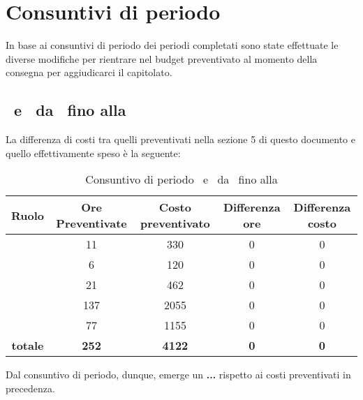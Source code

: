 \newpage
\section{Consuntivi di periodo}

In base ai consuntivi di periodo dei periodi completati sono state effettuate le diverse modifiche per rientrare nel budget preventivato al momento della consegna per aggiudicarci il capitolato.

\subsection{\PD\ e \COD\ da \RP\ fino alla \RQ}
La differenza di costi tra quelli preventivati nella sezione 5 di questo documento e quello effettivamente speso è la seguente:

\begin{table}[h]
	\begin{center}
		\begin{tabular}{|c|c|c|c|c|}
			\hline
			\textbf{Ruolo}	& \textbf{Ore Preventivate} & \textbf{Costo preventivato} &  \textbf{Differenza ore} & \textbf{Differenza costo}\\
			\hline
			\Pm &	11 & 330 & 0 & 0\\
			\hline
			\Am	&	6 & 120 & 0 & 0\\
			\hline
			\Prog	&	21 & 462 & 0 & 0\\
			\hline
			\Progr	&	137 & 2055 & 0 & 0\\
			\hline
			\Ver	&	77 & 1155 & 0 & 0\\
			\hline
			\textbf{totale}	&	\textbf{252} & \textbf{4122} & \textbf{0} & \textbf{0} \\
			\hline
		\end{tabular}
	\end{center}
	\caption{Consuntivo di periodo \PD\ e \COD\ da \RP\ fino alla \RQ}
\end{table}

Dal consuntivo di periodo, dunque, emerge un \textbf{...} rispetto ai costi preventivati in precedenza.
